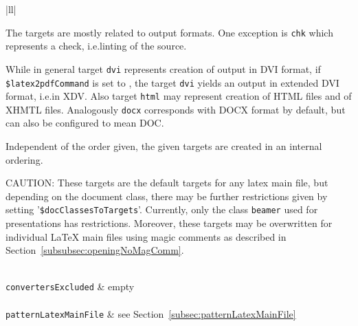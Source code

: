\begin{longtable}{|ll|}
{\begin{minipage}{0.95\linewidth}
The targets are mostly related to output formats. 
One exception is \texttt{chk} which represents a check, i.e.\@ linting of the source. 

While in general target \texttt{dvi} represents creation of output in DVI format, 
if \texttt{\$latex2pdfCommand} is set to \xelatex, 
the target \texttt{dvi} yields an output in extended DVI format, i.e.\@ in XDV\@. 
Also target \texttt{html} may represent creation of HTML files and of XHMTL files. 
Analogously \texttt{docx} corresponds with DOCX format by default, 
but can also be configured to mean DOC\@. 

Independent of the order given, the given targets are created 
in an internal ordering. 

CAUTION\@: These targets are the default targets for any latex main file, 
but depending on the document class, there may be further restrictions 
given by setting '\texttt{\$docClassesToTargets}'. 
Currently, only the class \texttt{beamer} used for presentations has restrictions. 
Moreover, these targets may be overwritten for individual \LaTeX{} main files 
using magic comments as described in Section~\ref{subsubsec:openingNoMagComm}. 

\end{minipage}
} \\
\texttt{convertersExcluded}          & empty     \\
 \\
\texttt{patternLatexMainFile} & see Section~\ref{subsec:patternLatexMainFile}\\
\end{longtable}
